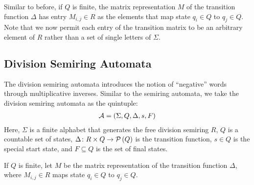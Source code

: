 \documentclass[12pt]{article}
\begin{document}
Similar to before,
if \(Q\) is finite,
the matrix representation \(M\) of the transition
function \(\Delta\) has entry \(M_{i, j} \in R\) as the
elements that map state \(q_i \in Q\) to \(q_j \in Q\).
Note that we now permit each entry of the transition matrix to be
an arbitrary element of \(R\) rather than a set of single letters of \(\Sigma\).


\subsection{Division Semiring Automata}
The division semiring automata introduces the notion of ``negative'' words
through multiplicative inverses.
Similar to the semiring automata,
we take the division semiring automata as the quintuple:
\begin{align*}
  \mathcal{A} = \left(\Sigma, Q, \Delta, s, F\right)
\end{align*}
Here, \(\Sigma\) is a finite alphabet that generates the
free division semiring \(R\),
\(Q\) is a countable set of states,
\(\Delta \colon R \times Q \to \mathcal{P}\left(Q\right)\) is the transition function,
\(s \in Q\) is the special start state,
and \(F \subseteq Q\) is the set of final states.

If \(Q\) is finite,
let \(M\) be the matrix representation of the transition function \(\Delta\),
where \(M_{i, j} \in R\) maps state \(q_i \in Q\) to \(q_j \in Q\).





\printbibliography
\end{document}
